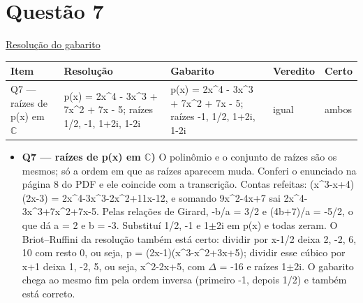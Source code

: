 \documentclass{article}%
\begin{document}
\section*{Questão 7}%
\href{https://poliedroresolve.sistemapoliedro.com.br/vestibulares/ita/2026/ita-2-fase-dia-1-28-10-2025-2-fase-dia-1/dissertativa-7-matematica-2-fase-dia-1-ita-2026}{Resolução do gabarito}\par\smallskip%
\begin{longtable}{@{}p{} p{} p{} p{} p{}@{}}\toprule Item & Resolução & Gabarito & Veredito & Certo \\ \midrule
Q7 --- raízes de p(x) em $\mathbb{C}$ & p(x) = 2x\^{}4 - 3x\^{}3 + 7x\^{}2 + 7x - 5; raízes 1/2, -1, 1+2i, 1-2i & p(x) = 2x\^{}4 - 3x\^{}3 + 7x\^{}2 + 7x - 5; raízes -1, 1/2, 1+2i, 1-2i & igual & ambos \\
\bottomrule\end{longtable}%
\begin{itemize}%
\item%
\textbf{Q7 --- raízes de p(x) em $\mathbb{C}$)} O polinômio e o conjunto de raízes são os mesmos; só a ordem em que as raízes aparecem muda. Conferi o enunciado na página 8 do PDF e ele coincide com a transcrição. Contas refeitas: (x\^{}3-x+4)(2x-3) = 2x\^{}4-3x\^{}3-2x\^{}2+11x-12, e somando 9x\^{}2-4x+7 sai 2x\^{}4-3x\^{}3+7x\^{}2+7x-5. Pelas relações de Girard, -b/a = 3/2 e (4b+7)/a = -5/2, o que dá a = 2 e b = -3. Substituí 1/2, -1 e 1$\pm$2i em p(x) e todas zeram. O Briot--Ruffini da resolução também está certo: dividir por x-1/2 deixa 2, -2, 6, 10 com resto 0, ou seja, p = (2x-1)(x\^{}3-x\^{}2+3x+5); dividir esse cúbico por x+1 deixa 1, -2, 5, ou seja, x\^{}2-2x+5, com $\Delta$ = -16 e raízes 1$\pm$2i. O gabarito chega ao mesmo fim pela ordem inversa (primeiro -1, depois 1/2) e também está correto.%
\end{itemize}%
\end{document}
